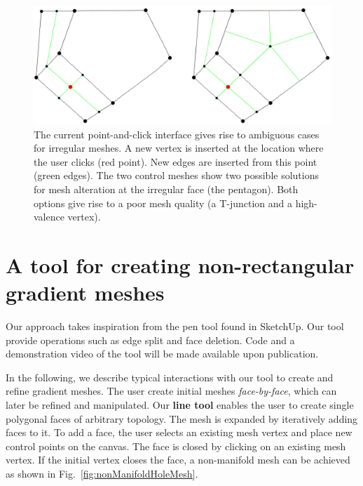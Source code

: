 \documentclass{egpubl}
\begin{document}
	\begin{figure}[t]
		\centering
		\includegraphics[scale=0.2]{pentagonCombined.png}
		\caption{The current point-and-click interface gives rise to ambiguous cases for irregular meshes. A new vertex is inserted at the location where the user clicks (red point). New edges are inserted from this point (green edges). The two control meshes show two possible solutions for mesh alteration at the irregular face (the pentagon). Both options give rise to a poor mesh quality (a T-junction and a high-valence vertex).
		}
		\label{fig:adHocPentagon}
	\end{figure}
	
	\section{A tool for creating non-rectangular gradient meshes}
	\label{sec:method}
	
	Our approach takes inspiration from the pen tool found in SketchUp. Our tool provide operations such as edge split and face deletion. Code and a demonstration video of the tool will be made available upon publication.
	
	In the following, we describe typical interactions with our tool to create and refine gradient meshes. The user create initial meshes \textit{face-by-face}, which can later be refined and manipulated. Our \textbf{line tool} enables the user to create single polygonal faces of arbitrary topology. The mesh is expanded by iteratively adding faces to it. To add a face, the user selects an existing mesh vertex and place new control points on the canvas. The face is closed by clicking on an existing mesh vertex. If the initial vertex closes the face, a non-manifold mesh can be achieved as shown in Fig.~\ref{fig:nonManifoldHoleMesh}.
	
\end{document}
